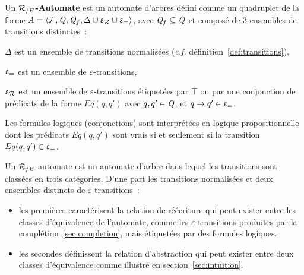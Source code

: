 \begin{definition}
  \label{def:re-automaton}
  Un \textbf{${\mathcal R_{/E}}$-Automate} est un automate d'arbres défini comme un quadruplet de la forme
  $\mathit A= \langle \mathcal{F}, \mathit Q, \mathit Q_f,\Delta \cup \upvarepsilon_{\mathcal R} \cup \upvarepsilon_{=}\rangle$,
  avec $\mathit Q_f \subseteq \mathit Q$ et composé de 3 ensembles de transitions distinctes~:

  \begin{description}
  \item $\Delta$ est un ensemble de transitions normalisées (\textit{c.f.} définition~\ref{def:transitions}),
  \item $\upvarepsilon_{=}$ est un ensemble de $\varepsilon$-transitions,
  \item $\upvarepsilon_{\mathcal R}$ est un ensemble de 
  $\varepsilon$-transitions étiquetées par $\top$ ou par une conjonction de prédicats de la forme $Eq(q, q')$ 
  avec $q, q' \in \mathit Q$, et $q \rightarrow q' \in \upvarepsilon_{=}$.
  \end{description}
  Les formules logiques (conjonctions) sont interprétées en logique propositionnelle dont les prédicats
  $Eq(q, q')$ sont vrais si et seulement si la transition $Eq(q, q') \in \upvarepsilon_{=}$.
\end{definition}


Un ${\mathcal R_{/E}}$-automate est un automate d'arbre dans lequel les transitions sont classées en trois catégories.  D'une part les
transitions normalisées et deux ensembles distincts de $\varepsilon$-transitions~:
\begin{itemize}
\item les premières caractérisent la relation de réécriture qui peut exister entre les classes
  d'équivalence de l'automate, comme les $\varepsilon$-transitions produites par la complétion~\ref{sec:completion}, 
  mais étiquetées par des formules logiques.

\item les secondes définissent la relation d'abstraction qui peut exister entre deux classes d'équivalence comme illustré en 
  section~\ref{sec:intuition}.
\end{itemize}







